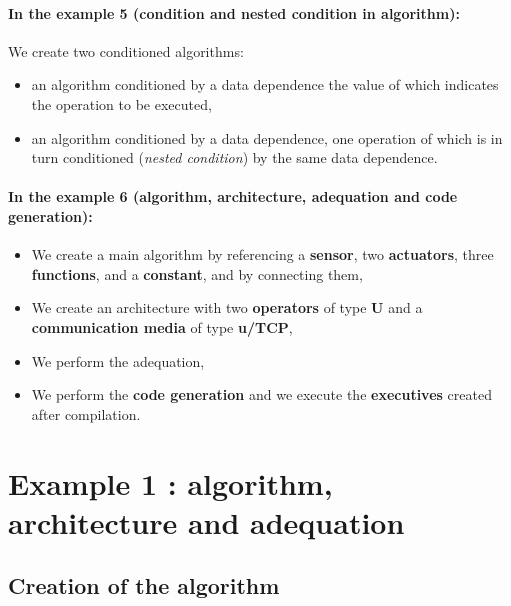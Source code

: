 \documentclass[a4paper,twoside]{report}
\begin{document}
\subsubsection{In the example 5 (condition and nested condition in
algorithm):}

We create two conditioned algorithms:
\begin{itemize}
\item an algorithm conditioned by a data dependence the value of which
indicates the operation to be executed,

\item an algorithm conditioned by a data dependence, one operation of which is
in turn conditioned (\textit{nested condition}) by the same data dependence.
\end{itemize}

\subsubsection{In the example 6 (algorithm, architecture, adequation
and code generation):}
\begin{itemize}
\item We create a main algorithm by referencing a \textbf{sensor}, two
\textbf{actuators}, three \textbf{functions}, and a \textbf{constant}, and by
connecting them,

\item We create an architecture with two \textbf{operators} of type
\textbf{U} and a \textbf{communication media} of type \textbf{u/TCP},

\item We perform the adequation,

\item We perform the \textbf{code generation} and we execute the
\textbf{executives} created after compilation.
\end{itemize}

\cleardoublepage
\chapter{Example 1 : algorithm, architecture and adequation}

\section{Creation of the algorithm}
\label{algo_ex1}
\end{document}
